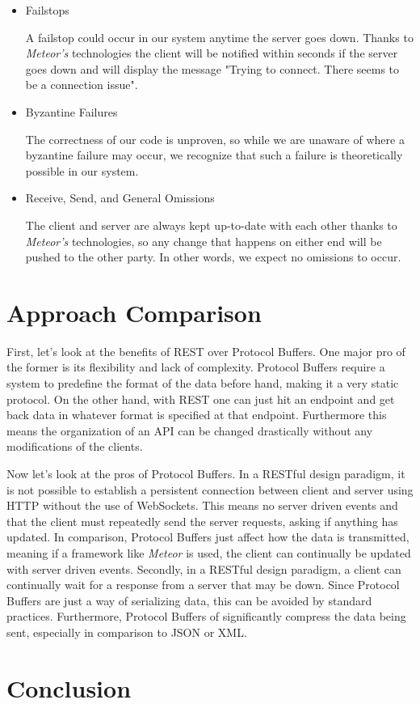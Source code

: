 \documentclass[11pt]{article} %
\begin{document}
\begin{itemize}
	\item Failstops
	
	A failstop could occur in our system anytime the server goes down. Thanks to \textit{Meteor's} technologies the client will be notified within seconds if the server goes down and will display the message "Trying to connect. There seems to be a connection issue".
	
	\item Byzantine Failures
	
	The correctness of our code is unproven, so while we are unaware of where a byzantine failure may occur, we recognize that such a failure is theoretically possible in our system.
	
	\item Receive, Send, and General Omissions
	
	The client and server are always kept up-to-date with each other thanks to \textit{Meteor's} technologies, so any change that happens on either end will be pushed to the other party. In other words, we expect no omissions to occur. 
\end{itemize}	


\section{Approach Comparison} 

First, let's look at the benefits of REST over Protocol Buffers. One major pro of the former is its flexibility and lack of complexity. Protocol Buffers require a system to predefine the format of the data before hand, making it a very static protocol. On the other hand, with REST one can just hit an endpoint and get back data in whatever format is specified at that endpoint. Furthermore this means the organization of an API can be changed drastically without any modifications of the clients.

Now let's look at the pros of Protocol Buffers. In a RESTful design paradigm, it is not possible to establish a persistent connection between client and server using HTTP without the use of WebSockets. This means no server driven events and that the client must repeatedly send the server requests, asking if anything has updated. In comparison, Protocol Buffers just affect how the data is transmitted, meaning if a framework like \textit{Meteor} is used, the client can continually be updated with server driven events. Secondly, in a RESTful design paradigm, a client can continually wait for a response from a server that may be down. Since Protocol Buffers are just a way of serializing data, this can be avoided by standard practices. Furthermore, Protocol Buffers of significantly compress the data being sent, especially in comparison to JSON or XML.

\section{Conclusion} 
\end{document}
